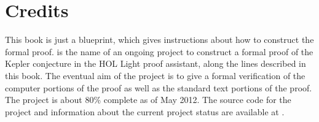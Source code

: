 
\chapter{Credits}\label{sec:credit}

This book is just a blueprint, which gives instructions about how to
construct the formal proof.
 is the name of an ongoing project to construct a
formal proof of the Kepler conjecture in the HOL Light proof
assistant, along the lines described in this book.  The eventual aim
of the project is to give a formal verification of the computer
portions of the proof as well as the standard text portions of the
proof.  The project is about 80\% complete as of May 2012.  
 The source code for the project and
information about the current project status are available at
\cite{website:FlyspeckProject}.


